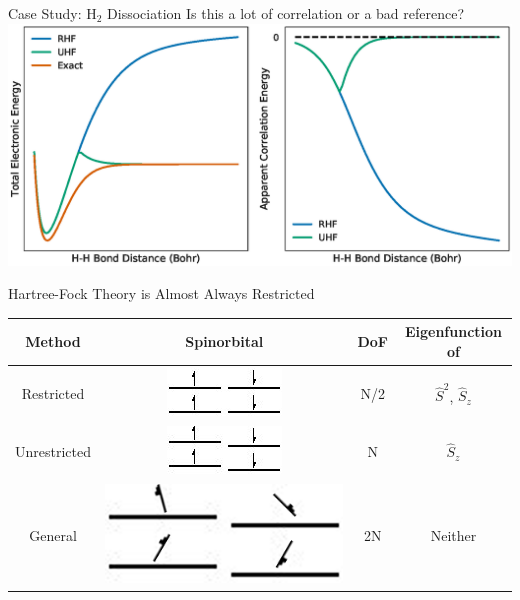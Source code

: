 \documentclass[10pt]{beamer}
\begin{document}
{%
\begin{frame}{Case Study: H$_2$ Dissociation}
  \centering
	Is this a lot of correlation or a bad reference?
	\includegraphics[width=\linewidth]{../figures/H2_curves.eps}
\end{frame}


{%
\begin{frame}[fragile]{Hartree-Fock Theory is Almost Always Restricted}
	\begin{center}
		\begin{tabular}{ | c | c | c | c |}
			\hline
			 \textbf{Method} & \textbf{Spinorbital} & \textbf{DoF} & \textbf{Eigenfunction of}\\
			\hline
			Restricted \rule{0pt}{8ex} &
        \includegraphics[width=0.2\linewidth]{../figures/rhf.jpg}
			& N/2
			& $\hat{S}^2$, $\hat{S}_z$
			\\ [4ex] \hline

			Unrestricted \rule{0pt}{8ex} &
			\includegraphics[width=0.2\linewidth]{../figures/uhf.jpg}
			& N & $\hat{S}_z$ \\ [4ex]
			\hline

			General \rule{0pt}{8ex} &
						\includegraphics[width=0.2\linewidth]{../figures/ghf.jpg}
			& 2N & Neither \\ [4ex]
			\hline
		\end{tabular}
	\end{center}
\end{frame}

}}
\end{document}

